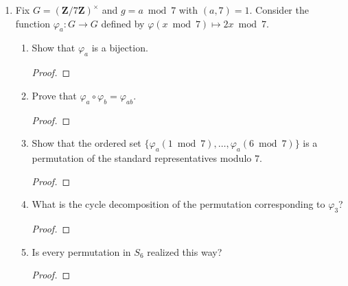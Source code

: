\documentclass[oneside,11pt]{amsart}
\newcommand{\ZZ}{\mathbf Z}
\theoremstyle{Theorem}
\theoremstyle{definition}
\begin{document}
\begin{enumerate}
\begin{enumerate}
\item $\left \{ \left( \begin{smallmatrix} a & b \\ 1/b & 1/a \end{smallmatrix} \right) \colon a,b \neq 0 \right \}.$
\item $\left \{ \left( \begin{smallmatrix} a & b \\ c & d \end{smallmatrix} \right) \colon ad-bc = 1  \right \}.$
\item $\left \{ \left( \begin{smallmatrix} a & b \\ 0 & 1 \end{smallmatrix} \right) \colon a \neq 0  \right \}.$
\end{enumerate}
\begin{proof}

\end{proof}

\newpage


\item Fix $G = (\ZZ/7\ZZ)^\times$ and $g = a \bmod 7$ with $(a,7) = 1$. Consider the function $\varphi_a \colon G \to G$ defined by $\varphi( x \bmod 7) \mapsto 2x \bmod 7$. 
\begin{enumerate}
\item Show that $\varphi_a$ is a bijection. 
\begin{proof}

\end{proof}
\item Prove that $\varphi_a \circ \varphi_b = \varphi_{ab}$. 
\begin{proof}

\end{proof}
\item Show that the ordered set $\{ \varphi_a(1 \bmod 7), \ldots, \varphi_a(6 \bmod 7) \}$ is a permutation of the standard representatives modulo $7$. 
\begin{proof}

\end{proof}
\item What is the cycle decomposition of the permutation corresponding to $\varphi_3$? 
\begin{proof}

\end{proof}
\item Is every permutation in $S_6$ realized this way? 
\begin{proof}

\end{proof}
\end{enumerate}

\end{enumerate}
\end{document}
